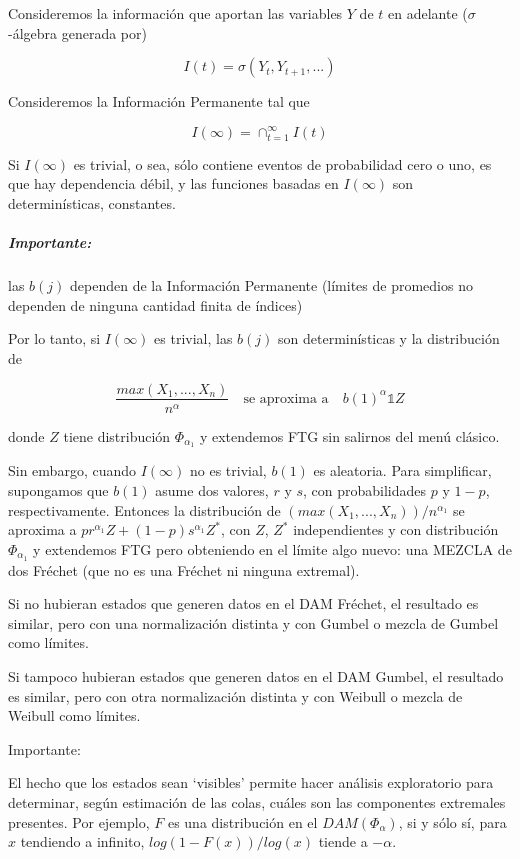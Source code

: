 \documentclass[
  12pt]{article}
\begin{document}
Consideremos la información que aportan las variables \(Y\) de \(t\) en
adelante (\(\sigma\)-álgebra generada por)

\begin{equation}
I(t)=\sigma(Y_t,Y_{t+1},...)
\end{equation}

Consideremos la Información Permanente tal que

\[
I(\infty)= \cap_{t=1}^{\infty} I(t)
\]

Si \(I(\infty)\) es trivial, o sea, sólo contiene eventos de
probabilidad cero o uno, es que hay dependencia débil, y las funciones
basadas en \(I(\infty)\) son determinísticas, constantes.

\subparagraph{Importante:}\label{importante-1}

las \(b(j)\) dependen de la Información Permanente (límites de promedios
no dependen de ninguna cantidad finita de índices)

Por lo tanto, si \(I(\infty)\) es trivial, las \(b(j)\) son
determinísticas y la distribución de

\[
\frac{max(X_1,...,X_n)}{n^{\alpha}}\quad\text{se aproxima a}\quad b(1)^{\alpha}\mathbb{1}Z
\]

donde \(Z\) tiene distribución \(\Phi_{\alpha_1}\) y extendemos FTG sin
salirnos del menú clásico.

Sin embargo, cuando \(I(\infty)\) no es trivial, \(b(1)\) es aleatoria.
Para simplificar, supongamos que \(b(1)\) asume dos valores, \(r\) y
\(s\), con probabilidades \(p\) y \(1-p\), respectivamente. Entonces la
distribución de \((max(X_1,...,X_n))/ n^{\alpha_1}\) se aproxima a
\(p r^{\alpha_1} Z+ (1-p) s^{\alpha_1} Z^*\), con \(Z\), \(Z^*\)
independientes y con distribución \(\Phi_{\alpha_1}\) y extendemos FTG
pero obteniendo en el límite algo nuevo: una MEZCLA de dos Fréchet (que
no es una Fréchet ni ninguna extremal).

Si no hubieran estados que generen datos en el DAM Fréchet, el resultado
es similar, pero con una normalización distinta y con Gumbel o mezcla de
Gumbel como límites.

Si tampoco hubieran estados que generen datos en el DAM Gumbel, el
resultado es similar, pero con otra normalización distinta y con Weibull
o mezcla de Weibull como límites.

Importante:

El hecho que los estados sean `visibles' permite hacer análisis
exploratorio para determinar, según estimación de las colas, cuáles son
las componentes extremales presentes. Por ejemplo, \(F\) es una
distribución en el \(DAM(\Phi_{\alpha})\), si y sólo sí, para \(x\)
tendiendo a infinito, \(log (1-F(x))/log(x)\) tiende a \(-\alpha\).
\end{document}

